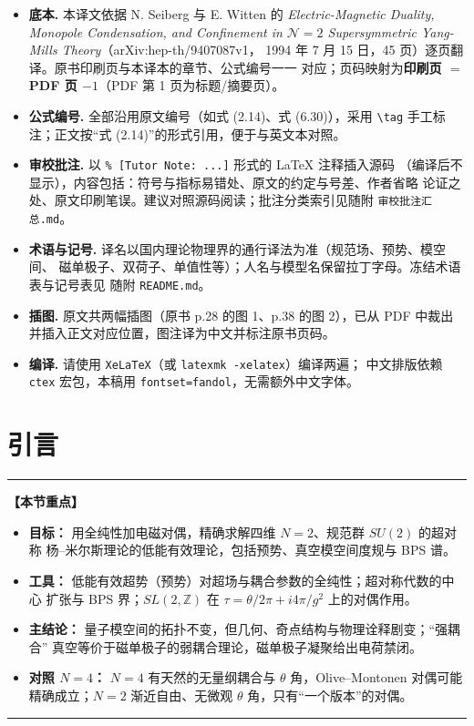 \documentclass[11pt,a4paper,UTF8,fontset=fandol]{ctexart}
\theoremstyle{plain}
\theoremstyle{definition}
\newenvironment{keypoints}{%
  \par\addvspace{0.9em}%
  \noindent\begin{minipage}{\linewidth}%
  \color{black!80}\rule{\linewidth}{0.6pt}\par\vspace{2pt}%
  \noindent\textbf{【本节重点】}\par\vspace{2pt}%
  \begin{itemize}[leftmargin=1.6em,itemsep=1pt,topsep=2pt,parsep=0pt]%
}{%
  \end{itemize}\vspace{1pt}\noindent\color{black!80}\rule{\linewidth}{0.6pt}%
  \end{minipage}\par\addvspace{0.9em}%
}
\newcommand{\Z}{\mathbb{Z}}
\newcommand{\Nc}{\mathcal{N}}
\def\Nc{N}%
\begin{document}
\begin{itemize}[leftmargin=1.6em,itemsep=2pt]
  \item \textbf{底本.} 本译文依据 N. Seiberg 与 E. Witten 的
        \emph{Electric-Magnetic Duality, Monopole Condensation, and Confinement in
        $\mathcal{N}=2$ Supersymmetric Yang-Mills Theory}（arXiv:hep-th/9407087v1，
        1994 年 7 月 15 日，45 页）逐页翻译。原书印刷页与本译本的章节、公式编号一一
        对应；页码映射为\textbf{印刷页 $=$ PDF 页 $-1$}（PDF 第 1 页为标题/摘要页）。
  \item \textbf{公式编号.} 全部沿用原文编号（如式 (2.14)、式 (6.30)），采用
        \verb|\tag| 手工标注；正文按“式 (2.14)”的形式引用，便于与英文本对照。
  \item \textbf{审校批注.} 以 \verb|% [Tutor Note: ...]| 形式的 \LaTeX{} 注释插入源码
        （编译后不显示），内容包括：符号与指标易错处、原文的约定与号差、作者省略
        论证之处、原文印刷笔误。建议对照源码阅读；批注分类索引见随附
        \verb|审校批注汇总.md|。
  \item \textbf{术语与记号.} 译名以国内理论物理界的通行译法为准（规范场、预势、模空间、
        磁单极子、双荷子、单值性等）；人名与模型名保留拉丁字母。冻结术语表与记号表见
        随附 \verb|README.md|。
  \item \textbf{插图.} 原文共两幅插图（原书 p.28 的图 1、p.38 的图 2），已从 PDF 中裁出
        并插入正文对应位置，图注译为中文并标注原书页码。
  \item \textbf{编译.} 请使用 \texttt{XeLaTeX}（或 \verb|latexmk -xelatex|）编译两遍；
        中文排版依赖 \verb|ctex| 宏包，本稿用 \verb|fontset=fandol|，无需额外中文字体。
\end{itemize}

\tableofcontents
\newpage



\section{引言}
\begin{keypoints}
  \item \textbf{目标：} 用全纯性加电磁对偶，精确求解四维 $\Nc=2$、规范群 $SU(2)$ 的超对称
        杨--米尔斯理论的低能有效理论，包括预势、真空模空间度规与 BPS 谱。
  \item \textbf{工具：} 低能有效超势（预势）对超场与耦合参数的全纯性；超对称代数的中心
        扩张与 BPS 界；$SL(2,\Z)$ 在 $\tau=\theta/2\pi+i4\pi/g^2$ 上的对偶作用。
  \item \textbf{主结论：} 量子模空间的拓扑不变，但几何、奇点结构与物理诠释剧变；“强耦合”
        真空等价于磁单极子的弱耦合理论，磁单极子凝聚给出电荷禁闭。
  \item \textbf{对照 $\Nc=4$：} $\Nc=4$ 有天然的无量纲耦合与 $\theta$ 角，Olive--Montonen
        对偶可能精确成立；$\Nc=2$ 渐近自由、无微观 $\theta$ 角，只有“一个版本”的对偶。
\end{keypoints}
\end{document}

